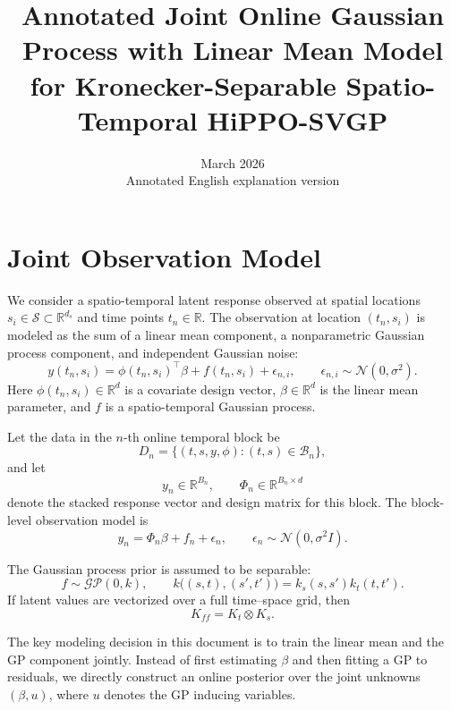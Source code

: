\documentclass[12pt]{article}
\title{Annotated Joint Online Gaussian Process with Linear Mean Model\\
for Kronecker-Separable Spatio-Temporal HiPPO-SVGP}
\author{}
\date{March 2026\\Annotated English explanation version}
\begin{document}
\maketitle

\section{Joint Observation Model}

We consider a spatio-temporal latent response observed at spatial locations
$s_i\in\mathcal{S}\subset\mathbb{R}^{d_s}$ and time points $t_n\in\mathbb{R}$.
The observation at location $(t_n,s_i)$ is modeled as the sum of a linear mean
component, a nonparametric Gaussian process component, and independent Gaussian noise:
\begin{equation}
y(t_n,s_i)
=
\phi(t_n,s_i)^\top \beta
+
f(t_n,s_i)
+
\epsilon_{n,i},
\qquad
\epsilon_{n,i}\sim\mathcal{N}(0,\sigma^2).
\label{eq:joint-observation-scalar}
\end{equation}
Here $\phi(t_n,s_i)\in\mathbb{R}^{d}$ is a covariate design vector,
$\beta\in\mathbb{R}^{d}$ is the linear mean parameter, and
$f$ is a spatio-temporal Gaussian process.

Let the data in the $n$-th online temporal block be
\begin{equation}
D_n=\{(t,s,y,\phi): (t,s)\in\mathcal{B}_n\},
\end{equation}
and let
\begin{equation}
y_n\in\mathbb{R}^{B_n},
\qquad
\Phi_n\in\mathbb{R}^{B_n\times d}
\end{equation}
denote the stacked response vector and design matrix for this block. The block-level
observation model is
\begin{equation}
y_n = \Phi_n \beta + f_n + \epsilon_n,
\qquad
\epsilon_n\sim\mathcal{N}(0,\sigma^2 I).
\label{eq:block-observation}
\end{equation}

The Gaussian process prior is assumed to be separable:
\begin{equation}
f\sim \mathcal{GP}(0,k),
\qquad
k\big((s,t),(s',t')\big)
=
k_s(s,s')k_t(t,t').
\label{eq:separable-kernel}
\end{equation}
If latent values are vectorized over a full time--space grid, then
\begin{equation}
K_{ff}=K_t\otimes K_s.
\label{eq:full-kron-prior}
\end{equation}

The key modeling decision in this document is to train the linear mean and the GP
component jointly. Instead of first estimating $\beta$ and then fitting a GP to residuals,
we directly construct an online posterior over the joint unknowns $(\beta,u)$, where
$u$ denotes the GP inducing variables.
\end{document}
